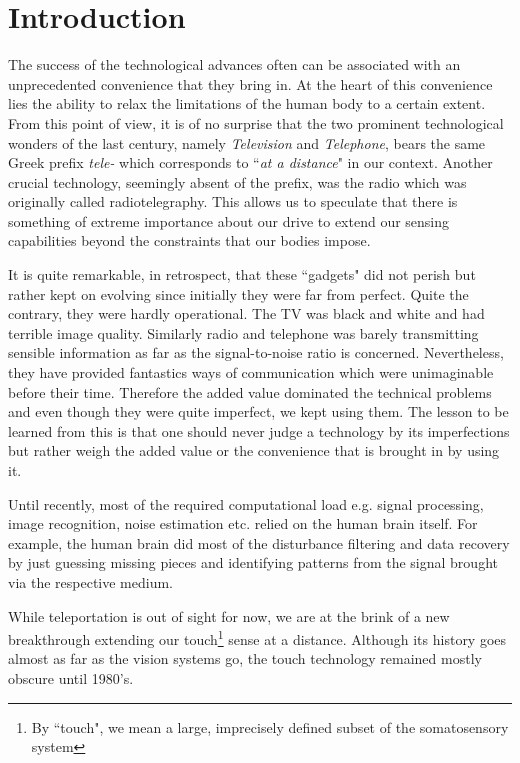\chapter{Introduction}
\label{chap:intro}

The success of the technological advances often can be associated with an unprecedented convenience that they bring in. At the heart of this convenience lies the ability to relax the limitations of the human body to a certain extent. From this point of view, it is of no surprise that the two prominent technological wonders of the last century, namely \emph{Television} and \emph{Telephone}, bears the same Greek prefix \emph{tele-} which corresponds to ``\emph{at a distance}" in our context. Another crucial technology, seemingly absent of the prefix, was the radio which was originally called radiotelegraphy. This allows us to speculate that there is something of extreme importance about our drive to extend our sensing capabilities beyond the constraints that our bodies impose. 


It is quite remarkable, in retrospect, that these ``gadgets" did not perish but rather kept on evolving since initially they were far from perfect. Quite the contrary, they were hardly operational. The TV was black and white and had terrible image quality. Similarly radio and telephone was barely transmitting sensible information as far as the signal-to-noise ratio is concerned. Nevertheless, they have provided fantastics ways of communication which were unimaginable before their time. Therefore the added value dominated the technical problems and even though they were quite imperfect, we kept using them. The lesson to be learned from this is that one should never judge a technology by its imperfections but rather weigh the added value or the convenience that is brought in by using it. 

Until recently, most of the required computational load e.g. signal processing, image recognition, noise estimation etc. relied on the human brain itself. For example, the human brain did most of the disturbance filtering and data recovery by just guessing missing pieces and identifying patterns from the signal brought via the respective medium.  



While teleportation is out of sight for now, we are at the brink of a new breakthrough extending our touch\footnote{By ``touch", we mean a large, imprecisely defined subset of the somatosensory system} sense at a distance. Although its history goes almost as far as the vision systems go, the touch technology remained mostly obscure until 1980's. 




